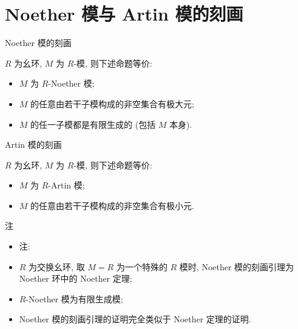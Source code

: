 
\section[刻画]{Noether 模与 Artin 模的刻画}


\begin{frame}{Noether 模的刻画}

\begin{lem}
$R$ 为幺环, $M$ 为 $R$-模, 则下述命题等价:
\begin{itemize}
\item[(i)] $M$ 为 $R$-Noether 模;
\item[(ii)] $M$ 的任意由若干子模构成的非空集合有极大元;
\item[(iii)] $M$ 的任一子模都是有限生成的 (包括 $M$ 本身).
\end{itemize}
\end{lem}

\end{frame}


\begin{frame}{Artin 模的刻画}

\begin{lem}
$R$ 为幺环, $M$ 为 $R$-模, 则下述命题等价:
\begin{itemize}
\item[(i)] $M$ 为 $R$-Artin 模;
\item[(ii)] $M$ 的任意由若干子模构成的非空集合有极小元.
\end{itemize}
\end{lem}

\end{frame}


\begin{frame}{注}

\begin{itemize}
\item 注:
\item {} $R$ 为交换幺环, 取 $M = R$ 为一个特殊的 $R$ 模时,
  Noether 模的刻画引理为 Noether 环中的 Noether 定理;
\item {} $R$-Noether 模为有限生成模;
\item {} Noether 模的刻画引理的证明完全类似于 Noether 定理的证明.
\end{itemize}

\end{frame}



